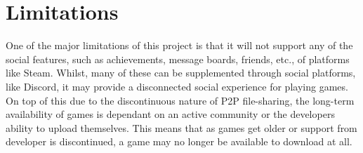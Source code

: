 
\section{Limitations}

One of the major limitations of this project is that it will not support any of the social features, such as achievements, message boards, friends, etc., of platforms like Steam. Whilst, many of these can be supplemented through social platforms, like Discord, it may provide a disconnected social experience for playing games. 
\x
On top of this due to the discontinuous nature of P2P file-sharing, the long-term availability of games is dependant on an active community or the developers ability to upload themselves. This means that as games get older or support from developer is discontinued, a game may no longer be available to download at all. 